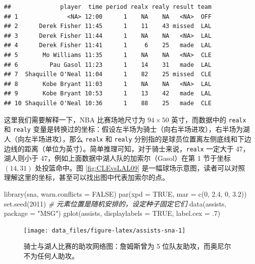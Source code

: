 \documentclass[
  b5paper,
  UTF8,twoside]{book}
\newenvironment{Shaded}{\begin{snugshade}}{\end{snugshade}}
\newcommand{\AttributeTok}[1]{\textcolor[rgb]{0.77,0.63,0.00}{#1}}
\newcommand{\CommentTok}[1]{\textcolor[rgb]{0.56,0.35,0.01}{\textit{#1}}}
\newcommand{\ConstantTok}[1]{\textcolor[rgb]{0.00,0.00,0.00}{#1}}
\newcommand{\DecValTok}[1]{\textcolor[rgb]{0.00,0.00,0.81}{#1}}
\newcommand{\FloatTok}[1]{\textcolor[rgb]{0.00,0.00,0.81}{#1}}
\newcommand{\FunctionTok}[1]{\textcolor[rgb]{0.00,0.00,0.00}{#1}}
\newcommand{\NormalTok}[1]{#1}
\newcommand{\StringTok}[1]{\textcolor[rgb]{0.31,0.60,0.02}{#1}}
\begin{document}
\begin{verbatim}
##              player  time period realx realy result team
## 1              <NA> 12:00      1    NA    NA   <NA>  OFF
## 2      Derek Fisher 11:45      1    11    43 missed  LAL
## 3      Derek Fisher 11:44      1    NA    NA   <NA>  LAL
## 4      Derek Fisher 11:41      1     6    25   made  LAL
## 5       Mo Williams 11:35      1    NA    NA   <NA>  CLE
## 6         Pau Gasol 11:23      1    14    31   made  LAL
## 7  Shaquille O'Neal 11:04      1    82    25 missed  CLE
## 8       Kobe Bryant 11:03      1    NA    NA   <NA>  LAL
## 9       Kobe Bryant 10:53      1    13    42   made  LAL
## 10 Shaquille O'Neal 10:36      1    88    25   made  CLE
\end{verbatim}

这里我们需要解释一下，NBA 比赛场地尺寸为 \(94\times50\) 英寸，而数据中的 \texttt{realx} 和 \texttt{realy} 变量是转换过的坐标：假设左半场为骑士（向右半场进攻），右半场为湖人（向左半场进攻），那么 \texttt{realx} 和 \texttt{realy} 分别指的是球员位置离左侧底线和下边边线的距离（单位为英寸）。简单推理可知，对于骑士来说，\texttt{realx} 一定大于 47，湖人则小于 47，例如上面数据中湖人队的加索尔（Gasol）在第 1 节于坐标 \((14,31)\) 处投篮命中。图 \ref{fig:CLEvsLAL09} 是一幅球场示意图，读者可以对照理解这里的坐标，甚至可以找出图中代表加索尔的点。

\begin{Shaded}
\begin{Highlighting}[]
\FunctionTok{library}\NormalTok{(sna, }\AttributeTok{warn.conflicts =} \ConstantTok{FALSE}\NormalTok{)}
\FunctionTok{par}\NormalTok{(}\AttributeTok{xpd =} \ConstantTok{TRUE}\NormalTok{, }\AttributeTok{mar =} \FunctionTok{c}\NormalTok{(}\DecValTok{0}\NormalTok{, }\FloatTok{2.4}\NormalTok{, }\DecValTok{0}\NormalTok{, }\FloatTok{3.2}\NormalTok{))}
\FunctionTok{set.seed}\NormalTok{(}\DecValTok{2011}\NormalTok{) }\CommentTok{\# 元素位置是随机安排的，设定种子固定它们}
\FunctionTok{data}\NormalTok{(assists, }\AttributeTok{package =} \StringTok{"MSG"}\NormalTok{)}
\FunctionTok{gplot}\NormalTok{(assists, }\AttributeTok{displaylabels =} \ConstantTok{TRUE}\NormalTok{, }\AttributeTok{label.cex =}\NormalTok{ .}\DecValTok{7}\NormalTok{)}
\end{Highlighting}
\end{Shaded}

\begin{figure}

{\centering \texttt{[image: data\_files/figure-latex/assists-sna-1]} 

}

\caption[ 骑士与湖人比赛的助攻网络图 ]{骑士与湖人比赛的助攻网络图：詹姆斯曾为 5 位队友助攻，而奥尼尔不为任何人助攻。}\label{fig:assists-sna}
\end{figure}
\end{document}
